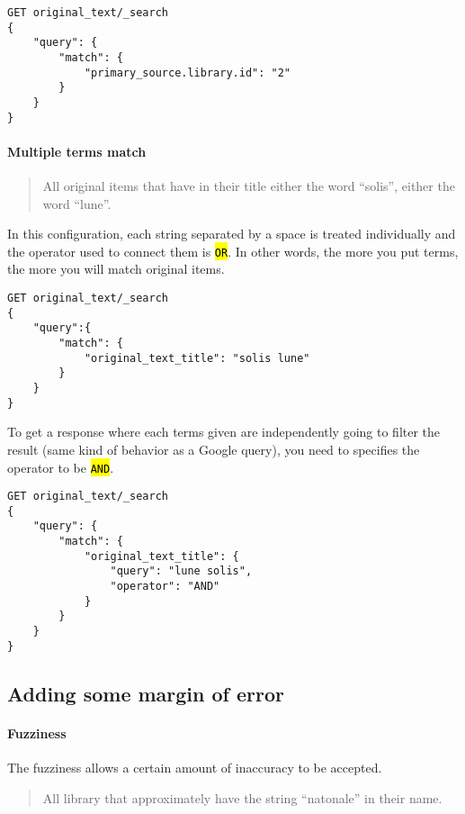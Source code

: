 \documentclass[a4paper,12pt]{article}
\let\OldTexttt\texttt
\renewcommand{\texttt}[1]{\OldTexttt{\hl{#1}}}
\begin{document}
\begin{lstlisting}
GET original_text/_search
{
    "query": {
        "match": {
            "primary_source.library.id": "2"
        }
    }
}
\end{lstlisting}

\paragraph{Multiple terms match}\label{multiple-terms-match}

\begin{quote}
All original items that have in their title either the word ``solis'', either the word ``lune''.
\end{quote}

In this configuration, each string separated by a space is treated individually and the operator used to connect them is \texttt{OR}. In other words, the more you put terms, the more you will match original items.

\begin{lstlisting}
GET original_text/_search
{
    "query":{
        "match": {
            "original_text_title": "solis lune"
        }
    }
}
\end{lstlisting}

To get a response where each terms given are independently going to filter the result (same kind of behavior as a Google query), you need to specifies the operator to be \texttt{AND}.

\begin{lstlisting}
GET original_text/_search
{
    "query": {
        "match": {
            "original_text_title": {
                "query": "lune solis",
                "operator": "AND"
            }
        }
    }
}
\end{lstlisting}

\subsection{Adding some margin of error}\label{adding-some-margin-of-error}

\paragraph{Fuzziness}\label{fuzziness}

The fuzziness allows a certain amount of inaccuracy to be accepted.

\begin{quote}
All library that approximately have the string ``natonale'' in their name.
\end{quote}
\end{document}
